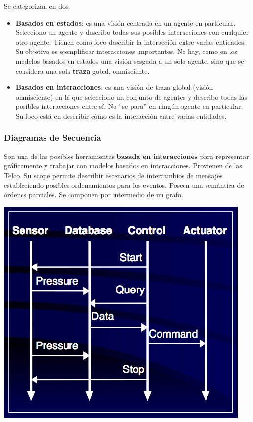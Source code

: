 \documentclass[]{article}
\begin{document}
Se categorizan en dos:
\begin{itemize}
	\item \textbf{Basados en estados}: es una visión centrada en un agente en particular. Selecciono un agente y describo todas sus posibles interacciones con cualquier otro agente. Tienen como foco describir la interacción entre varias
entidades. Su objetivo es ejemplificar interacciones importantes. No hay, como en los modelos basados en estados una visión sesgada a un sólo agente, sino que se considera una sola \textbf{traza} gobal, omnisciente.

	\item \textbf{Basados en interacciones}: es una visión de traza global (visión omnisciente) en la que selecciono un conjunto de agentes y describo todas las posibles interacciones entre sí. No ``se para'' en ningún agente en particular. Su foco está en describir cómo es la interacción entre varias entidades.
\end{itemize}

\subsubsection{Diagramas de Secuencia}
Son una de las posibles herramientas \textbf{basada en interacciones} para representar gráficamente y trabajar con modelos basados en interacciones. Provienen de las Telco. Su scope permite describir escenarios de intercambios de mensajes estableciendo posibles ordenamientos para los eventos. Poseen una semántica de órdenes parciales. Se componen por intermedio de un grafo.

\begin{center}
	\includegraphics[scale=0.5]{DiagSeq.png}
\end{center}
\end{document}
